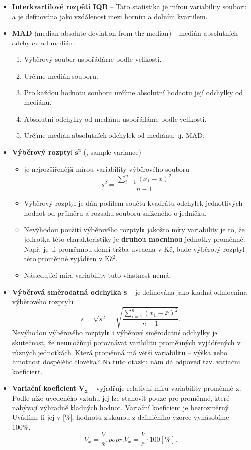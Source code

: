\begin{itemize}
	\item \textbf{Interkvartilové rozpětí IQR} -- Tato statistika je mírou variability souboru a je definována jako vzdálenost mezi horním a dolním kvartilem.
	\item \textbf{MAD} (median absolute deviation from the median) -- medián absolutních odchylek od mediánu.
			\begin{enumerate}
				\item Výběrový soubor uspořádáme podle velikosti.
				\item Určíme medián souboru.
				\item Pro každou hodnotu souboru určíme absolutní hodnotu její odchylky od mediánu.
				\item Absolutní odchylky od mediánu uspořádáme podle velikosti.
				\item Určíme medián absolutních odchylek od mediánu, tj. MAD.
			\end{enumerate}
	\item \textbf{Výběrový rozptyl} $\mathbf{s^2}$ (, sample variance) --
		\begin{itemize}
 			\item  je nejrozšířenější mírou variability výběrového souboru
			\begin{equation*}
				s^2 = \frac{\sum\limits_{i=1}^n (x_1 - \bar{x})^2} {n - 1}
			\end{equation*}
		\item Výběrový rozptyl je dán podílem součtu kvadrátu odchylek jednotlivých hodnot od průměru a rozsahu souboru sníženého o jedničku.
		\item Nevýhodou použití výběrového rozptylu jakožto míry variability je to, že jednotka této charakteristiky je \textbf{druhou mocninou} jednotky proměnné. Např. je--li proměnnou denní tržba uvedena v Kč, bude výběrový rozptyl této proměnné vyjádřen v Kč$^2$.
		\item Následující míra variability tuto vlastnost nemá.
	\end{itemize}
	\item \textbf{Výběrová směrodatná odchylka s} -- je definována jako kladná odmocnina výběrového rozptylu
	\begin{equation*}
				s = \sqrt{s^2} = \sqrt{\frac{\sum\limits_{i=1}^n (x_1 - \bar{x})^2} {n - 1}}.
	\end{equation*}
	Nevýhodou výběrového rozptylu i výběrové směrodatné odchylky je skutečnost, že neumožňují porovnávat varibilitu proměnných vyjádřených v různých jednotkách. Která proměnná má větší variabilitu – výška nebo hmotnost dospělého člověka? Na tuto otázku nám dá odpověď tzv. variační koeficient.
	\item \textbf{Variační koeficient} $\mathbf{V_x}$ -- vyjadřuje relativní míru variability proměnné x. Podle níže uvedeného vztahu jej lze stanovit pouze pro proměnné, které nabývají výhradně kladných hodnot. Variační koeficient je bezrozměrný. Uvádíme-li jej v [\%], hodnotu získanou z definičního vzorce vynásobíme 100\%.
	\begin{equation*}
				V_x = \frac{V}{\bar{x}}, popr. V_x = \frac{V}{\bar{x}} \cdot 100 [\%].
	\end{equation*}
\end{itemize}

